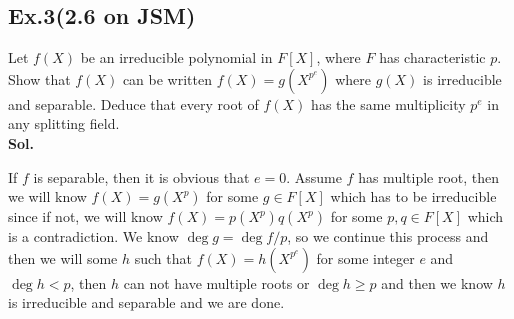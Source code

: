 \documentclass[lang=en,11pt,a4paper,citestyle =authoryear]{elegantpaper}
\begin{document}
\subsection*{Ex.3(2.6 on JSM)}
Let $f(X)$ be an irreducible polynomial in $F[X]$, where $F$ has characteristic $p$. Show that $f(X)$ can be written $f(X) = g(X^{p^e})$ where $g(X)$ is irreducible and separable. Deduce that every root of $f(X)$ has the same multiplicity $p^e$ in any splitting field.
\vspace{0.5em}\\
\textbf{Sol.} \par
\iffalse
    If $f(x)$ is irreducible, then $\gcd(f,f')=1$ unless $f'=0$.
\begin{enumerate}[\text{Case }1.]
\item $\gcd(f,f')=1$. Then, $f$ is separable and irreducible, hence $g(x^{p^e})=f(x)$ for $g=f$ and $e=0$.
\item $f'=0$. Then, $f(x)=g_0(x^p)$ for some $g_0$. Clearly, $g_0$ is irreducible. We show $g_0$ is separable. If not, $\gcd(g_0,g_0')\ne 1$ unless $g_0'=0$. If $g_0'\ne 0$, then there is $d$ such that $d\ |\ g_0$ and $d\ |\ g_0'$, contradicts with the irreducibility of $g_0$. Otherwise, $g_0'=0$, hence $g_0(x)=g_1(x^p)$ for some $g_1$. Then, $$f(x)=g_0(x^p)=g_1((x^p)^p)=g_1(x^{p^2}).$$
Similarly, $g_1$ is irreducible. Since $\deg g_0<\deg f$, in finite steps, we must have $f(x)=g_0(x^p)=g_m(x^{p^e})$ for some $e$. Then, $g_m$ is clearly irreducible. It is separable, since $g_m'\ne 0$. 

Then, we know $g(x)=\prod_{i=1}^{n}(x-x_i)$ in the splitting field of $g$ for some distinct roots $x_i$, where $n=\deg g$. For every $i$, let $\alpha_i$ be a root of $x^{p^e}-x_i$, then as a consequence of char$(F)=p$, we have $$(x-\alpha_i)^{p^e}=x^{p^e}-\alpha_i^{p^e}=x^{p^e}-x_i.$$ So,$$f(x)=\prod_i(x-\alpha_i)^{p^e}.$$
This proves the claim.
\end{enumerate}
\fi
    If $f$ is separable, then it is obvious that $e=0$. Assume $f$ has multiple root, then we will know $f(X) = g(X^p)$ for some $g\in F[X]$ which has to be irreducible since if not, we will know $f(X) = p(X^p)q(X^p)$ for some $p,q\in F[X]$ which is a contradiction. We know $\deg g = \deg f/p$, so we continue this process and then we will some $h$ such that $f(X) = h(X^{p^e})$ for some integer $e$ and $\deg h<p$, then $h$ can not have multiple roots or $\deg h \geq p$ and then we know $h$ is irreducible and separable and we are done.
\par 
\vspace{0.5em}
\end{document}
